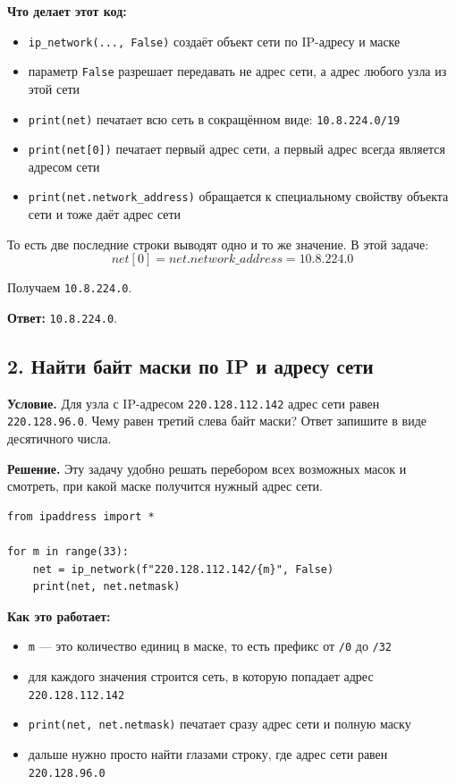 \documentclass[11pt]{article}
\begin{document}
\textbf{Что делает этот код:}
\begin{itemize}
  \item \texttt{ip\_network(..., False)} создаёт объект сети по IP-адресу и маске
  \item параметр \texttt{False} разрешает передавать не адрес сети, а адрес любого узла из этой сети
  \item \texttt{print(net)} печатает всю сеть в сокращённом виде: \texttt{10.8.224.0/19}
  \item \texttt{print(net[0])} печатает первый адрес сети, а первый адрес всегда является адресом сети
  \item \texttt{print(net.network\_address)} обращается к специальному свойству объекта сети и тоже даёт адрес сети
\end{itemize}

То есть две последние строки выводят одно и то же значение. В этой задаче:
\[
net[0] = net.network\_address = 10.8.224.0
\]

Получаем \texttt{10.8.224.0}.

\textbf{Ответ:} \texttt{10.8.224.0}.

\subsection*{2. Найти байт маски по IP и адресу сети}

\textbf{Условие.} Для узла с IP-адресом \texttt{220.128.112.142} адрес сети равен \texttt{220.128.96.0}. Чему равен третий слева байт маски? Ответ запишите в виде десятичного числа.

\textbf{Решение.} Эту задачу удобно решать перебором всех возможных масок и смотреть, при какой маске получится нужный адрес сети.

\begin{verbatim}
from ipaddress import *

for m in range(33):
    net = ip_network(f"220.128.112.142/{m}", False)
    print(net, net.netmask)
\end{verbatim}

\textbf{Как это работает:}
\begin{itemize}
  \item \texttt{m} --- это количество единиц в маске, то есть префикс от \texttt{/0} до \texttt{/32}
  \item для каждого значения строится сеть, в которую попадает адрес \texttt{220.128.112.142}
  \item \texttt{print(net, net.netmask)} печатает сразу адрес сети и полную маску
  \item дальше нужно просто найти глазами строку, где адрес сети равен \texttt{220.128.96.0}
\end{itemize}
\end{document}
